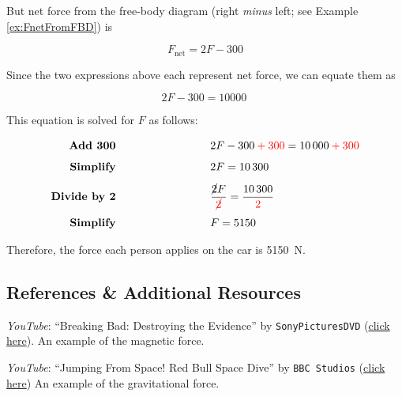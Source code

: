 \documentclass[main.tex]{subfiles}
\begin{document}
But net force from the free-body diagram (right \textit{minus} left; see Example \ref{ex:FnetFromFBD}) is

\begin{equation*}
    F_{\text{net}} = 2F - 300
\end{equation*}

Since the two expressions above each represent net force, we can equate them as

\begin{equation*}
    2F - 300 = \SI{10000}{}
\end{equation*}

This equation is solved for $F$ as follows:

\begin{align*}
    \textbf{Add 300} \hspace{9cm} 
    & \hspace{-6cm} 2F - 300 \mathbin{\textcolor{red}{+}} \textcolor{red}{300} = \SI{10000}{} \mathbin{\textcolor{red}{+}} \textcolor{red}{300}\\[1ex]
    \textbf{Simplify} \hspace{9cm}
    & \hspace{-6cm} 2F = \SI{10300}{}\\[1ex]
    \textbf{Divide by 2} \hspace{9cm}
    & \hspace{-6cm} \frac{\cancel{2}F}{\textcolor{red}{\cancel{2}}} = \frac{\SI{10300}{}}{\textcolor{red}{2}}\\[1ex]
    \textbf{Simplify} \hspace{9cm} 
    & \hspace{-6cm} F = 5150
\end{align*}

Therefore, the force each person applies on the car is \SI{5150}{N}.

\endsolution

\vspace{1em}

\cyanhrule


\subsection{References \& Additional Resources}

\textit{YouTube}: ``Breaking Bad: Destroying the Evidence'' by \texttt{SonyPicturesDVD} (\href{https://youtu.be/gzCXowhks80?t=3}{click here}). An example of the magnetic force.

\textit{YouTube}: ``Jumping From Space! Red Bull Space Dive'' by \texttt{BBC Studios} (\href{https://youtu.be/E9oKEJ1pXPw}{click here}) An example of the gravitational force.
\end{document}

